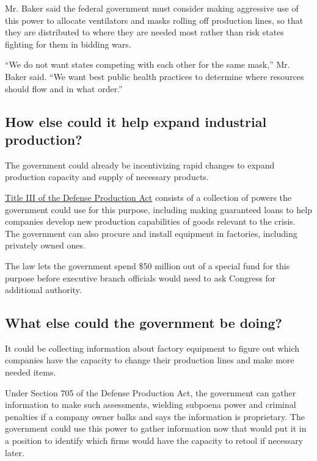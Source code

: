 Mr. Baker said the federal government must consider making aggressive
use of this power to allocate ventilators and masks rolling off
production lines, so that they are distributed to where they are needed
most rather than risk states fighting for them in bidding wars.

``We do not want states competing with each other for the same mask,''
Mr. Baker said. ``We want best public health practices to determine
where resources should flow and in what order.''

\hypertarget{how-else-could-it-help-expand-industrial-production}{%
\subsection{How else could it help expand industrial
production?}\label{how-else-could-it-help-expand-industrial-production}}

The government could already be incentivizing rapid changes to expand
production capacity and supply of necessary products.

\href{https://www.fema.gov/media-library-data/20130726-1650-20490-5258/final__defense_production_act_091030.pdf}{Title
III of the Defense Production Act} consists of a collection of powers
the government could use for this purpose, including making guaranteed
loans to help companies develop new production capabilities of goods
relevant to the crisis. The government can also procure and install
equipment in factories, including privately owned ones.

The law lets the government spend \$50 million out of a special fund for
this purpose before executive branch officials would need to ask
Congress for additional authority.

\hypertarget{what-else-could-the-government-be-doing}{%
\subsection{What else could the government be
doing?}\label{what-else-could-the-government-be-doing}}

It could be collecting information about factory equipment to figure out
which companies have the capacity to change their production lines and
make more needed items.

Under Section 705 of the Defense Production Act, the government can
gather information to make such assessments, wielding subpoena power and
criminal penalties if a company owner balks and says the information is
proprietary. The government could use this power to gather information
now that would put it in a position to identify which firms would have
the capacity to retool if necessary later.

